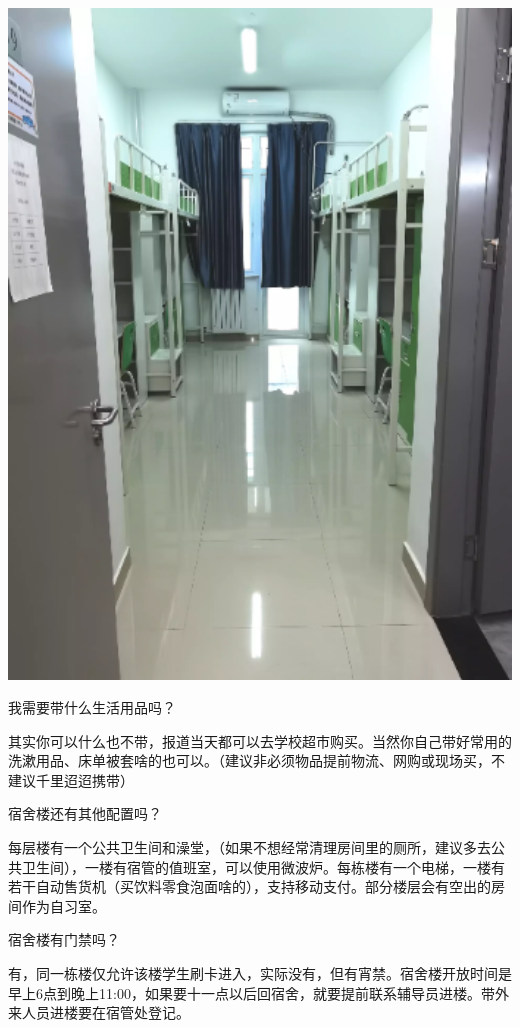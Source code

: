 \documentclass[UTF8]{ctexart}
\newcommand{\faq}[1]{{\heiti #1}}
\begin{document}
\begin{center}
\begin{minipage}{0.45\textwidth}
    \centerline{\includegraphics[width=1\textwidth]{images/dorm-s6.png}}
\end{minipage}
\end{center}

\faq{我需要带什么生活用品吗？}

其实你可以什么也不带，报道当天都可以去学校超市购买。当然你自己带好常用的洗漱用品、床单被套啥的也可以。（建议非必须物品提前物流、网购或现场买，不建议千里迢迢携带）

\faq{宿舍楼还有其他配置吗？}

每层楼有一个公共卫生间和澡堂，（如果不想经常清理房间里的厕所，建议多去公共卫生间），一楼有宿管的值班室，可以使用微波炉。每栋楼有一个电梯，一楼有若干自动售货机（买饮料零食泡面啥的），支持移动支付。部分楼层会有空出的房间作为自习室。

\faq{宿舍楼有门禁吗？}

有，同一栋楼仅允许该楼学生刷卡进入，实际没有，但有宵禁。宿舍楼开放时间是早上6点到晚上11:00，如果要十一点以后回宿舍，就要提前联系辅导员进楼。带外来人员进楼要在宿管处登记。
\end{document}
